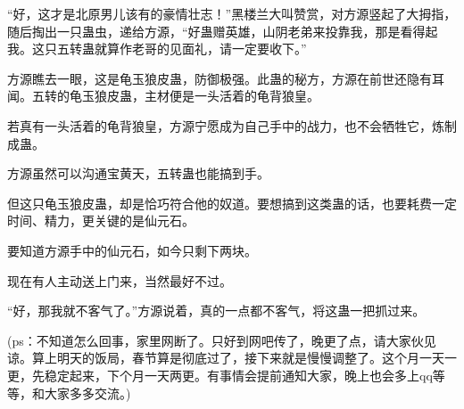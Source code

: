 \begin{this_body}
“好，这才是北原男儿该有的豪情壮志！”黑楼兰大叫赞赏，对方源竖起了大拇指，随后掏出一只蛊虫，递给方源，“好蛊赠英雄，山阴老弟来投靠我，那是看得起我。这只五转蛊就算作老哥的见面礼，请一定要收下。”

方源瞧去一眼，这是龟玉狼皮蛊，防御极强。此蛊的秘方，方源在前世还隐有耳闻。五转的龟玉狼皮蛊，主材便是一头活着的龟背狼皇。

若真有一头活着的龟背狼皇，方源宁愿成为自己手中的战力，也不会牺牲它，炼制成蛊。

方源虽然可以沟通宝黄天，五转蛊也能搞到手。

但这只龟玉狼皮蛊，却是恰巧符合他的奴道。要想搞到这类蛊的话，也要耗费一定时间、精力，更关键的是仙元石。

要知道方源手中的仙元石，如今只剩下两块。

现在有人主动送上门来，当然最好不过。

“好，那我就不客气了。”方源说着，真的一点都不客气，将这蛊一把抓过来。

(ps：不知道怎么回事，家里网断了。只好到网吧传了，晚更了点，请大家伙见谅。算上明天的饭局，春节算是彻底过了，接下来就是慢慢调整了。这个月一天一更，先稳定起来，下个月一天两更。有事情会提前通知大家，晚上也会多上qq等等，和大家多多交流。)

\end{this_body}

